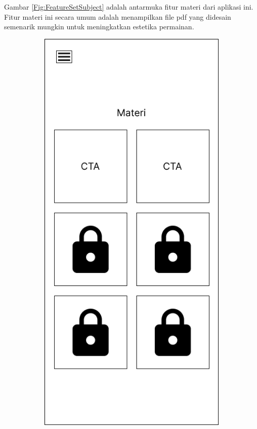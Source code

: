 Gambar \ref*{Fig:FeatureSetSubject} adalah antarmuka fitur materi dari aplikasi ini.
Fitur materi ini secara umum adalah menampilkan file pdf yang didesain semenarik mungkin untuk meningkatkan estetika permainan.
\begin{figure}[H]
	\centering
	\begin{subfigure}[b]{0.3\textwidth}
		\centering
	  \includegraphics[width=\linewidth]{contents/chapter-3/images/MF-materi.png}

\end{subfigure}
\end{figure}
